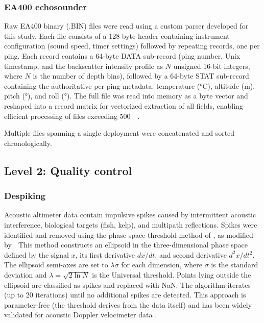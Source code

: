 \subsubsection{EA400 echosounder}

Raw EA400 binary (.BIN) files were read using a custom parser
developed for this study. Each file consists of a 128-byte header
containing instrument configuration (sound speed, timer settings)
followed by repeating records, one per ping. Each record contains a
64-byte DATA sub-record (ping number, Unix timestamp, and the
backscatter intensity profile as $N$ unsigned 16-bit integers, where
$N$ is the number of depth bins), followed by a 64-byte STAT
sub-record containing the authoritative per-ping metadata:
temperature (\si{\celsius}), altitude (\si{\meter}), pitch
(\si{\degree}), and roll (\si{\degree}). The full file was read into
memory as a byte vector and reshaped into a record matrix for
vectorized extraction of all fields, enabling efficient processing
of files exceeding \SI{500}{\mega\byte}.

Multiple files spanning a single deployment were concatenated and
sorted chronologically.

\subsection{Level 2: Quality control}

\subsubsection{Despiking}

Acoustic altimeter data contain impulsive spikes caused by
intermittent acoustic interference, biological targets (fish, kelp),
and multipath reflections. Spikes were identified and removed using
the phase-space threshold method of \citet{goring2002}, as modified
by \citet{mori2005}. This method constructs an ellipsoid in the
three-dimensional phase space defined by the signal $x$, its first
derivative $dx/dt$, and second derivative $d^2x/dt^2$. The ellipsoid
semi-axes are set to $\lambda \sigma$ for each dimension, where
$\sigma$ is the standard deviation and $\lambda = \sqrt{2 \ln N}$ is
the Universal threshold. Points lying outside the ellipsoid are
classified as spikes and replaced with NaN. The algorithm iterates
(up to 20 iterations) until no additional spikes are detected. This
approach is parameter-free (the threshold derives from the data
itself) and has been widely validated for acoustic Doppler velocimeter
data \citep{goring2002}.

